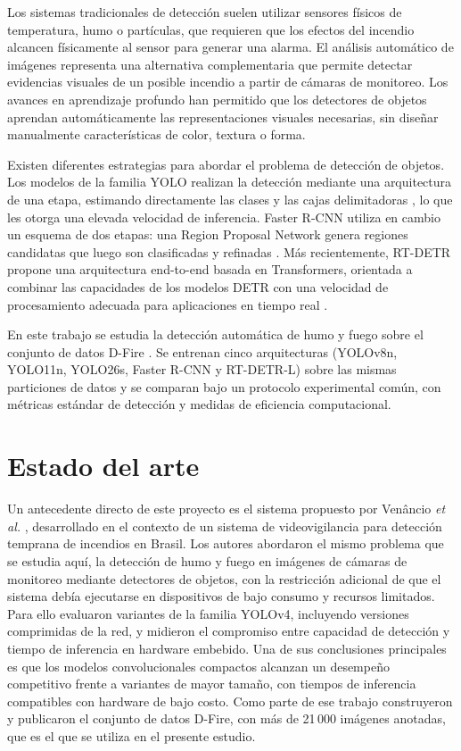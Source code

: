 \documentclass[conference]{IEEEtran}
\begin{document}
Los sistemas tradicionales de detección suelen utilizar sensores físicos de
temperatura, humo o partículas, que requieren que los efectos del incendio
alcancen físicamente al sensor para generar una alarma. El análisis
automático de imágenes representa una alternativa complementaria que permite
detectar evidencias visuales de un posible incendio a partir de cámaras de
monitoreo. Los avances en aprendizaje profundo han permitido que los
detectores de objetos aprendan automáticamente las representaciones
visuales necesarias, sin diseñar manualmente características de color,
textura o forma.

Existen diferentes estrategias para abordar el problema de detección de
objetos. Los modelos de la familia YOLO realizan la detección mediante una
arquitectura de una etapa, estimando directamente las clases y las cajas
delimitadoras \cite{b1}, lo que les otorga una elevada velocidad de
inferencia. Faster R-CNN utiliza en cambio un esquema de dos etapas: una
Region Proposal Network genera regiones candidatas que luego son
clasificadas y refinadas \cite{b2}. Más recientemente, RT-DETR propone una
arquitectura end-to-end basada en Transformers, orientada a combinar las
capacidades de los modelos DETR con una velocidad de procesamiento adecuada
para aplicaciones en tiempo real \cite{b3}.

En este trabajo se estudia la detección automática de humo y fuego sobre el
conjunto de datos D-Fire \cite{b4}. Se entrenan cinco arquitecturas
(YOLOv8n, YOLO11n, YOLO26s, Faster R-CNN y RT-DETR-L) sobre las mismas
particiones de datos y se comparan bajo un protocolo experimental común, con
métricas estándar de detección y medidas de eficiencia computacional.


\section{Estado del arte}

Un antecedente directo de este proyecto es el sistema propuesto por
Venâncio \textit{et al.} \cite{b4}, desarrollado en el contexto de un
sistema de videovigilancia para detección temprana de incendios en Brasil.
Los autores abordaron el mismo problema que se estudia aquí, la detección de
humo y fuego en imágenes de cámaras de monitoreo mediante detectores de
objetos, con la restricción adicional de que el sistema debía ejecutarse en
dispositivos de bajo consumo y recursos limitados. Para ello evaluaron
variantes de la familia YOLOv4, incluyendo versiones comprimidas de la red,
y midieron el compromiso entre capacidad de detección y tiempo de
inferencia en hardware embebido. Una de sus conclusiones principales es que
los modelos convolucionales compactos alcanzan un desempeño competitivo
frente a variantes de mayor tamaño, con tiempos de inferencia compatibles
con hardware de bajo costo. Como parte
de ese trabajo construyeron y publicaron el conjunto de datos D-Fire, con
más de 21\,000 imágenes anotadas, que es el que se utiliza en el presente
estudio.
\end{document}
